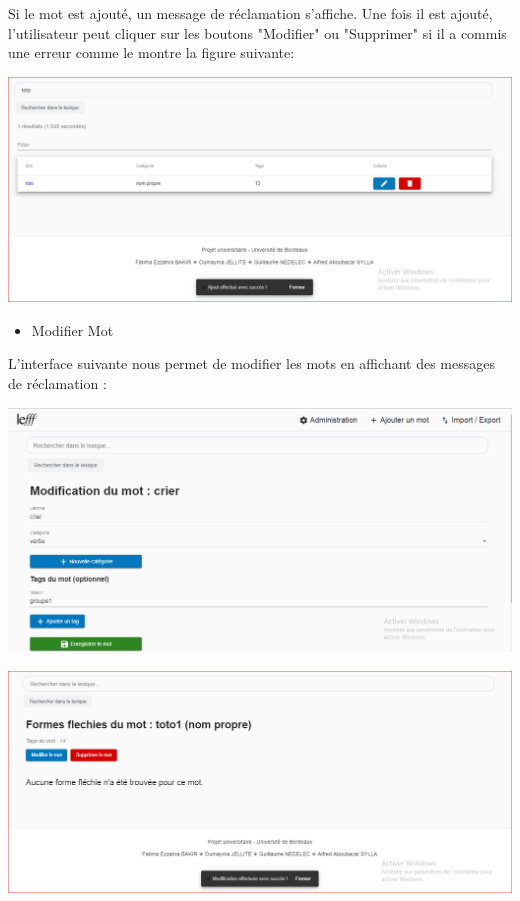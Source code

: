 \documentclass[12pt,a4paper]{article}
\begin{document}
Si le mot  est ajouté, un message de réclamation s'affiche. Une fois il est ajouté, l'utilisateur peut cliquer sur les boutons "Modifier" ou "Supprimer" si il a commis une erreur comme le montre la figure suivante:


\includegraphics[width=150mm]{img/AjoutEffectuer.PNG}


\begin{itemize}  
  \item Modifier Mot
\end{itemize}
L'interface suivante nous permet de modifier les mots en affichant des messages de réclamation : 

\includegraphics[width=150mm]{img/ModificationMot.PNG}


\includegraphics[width=150mm]{img/ModificationEffectuer.PNG}
\end{document}
